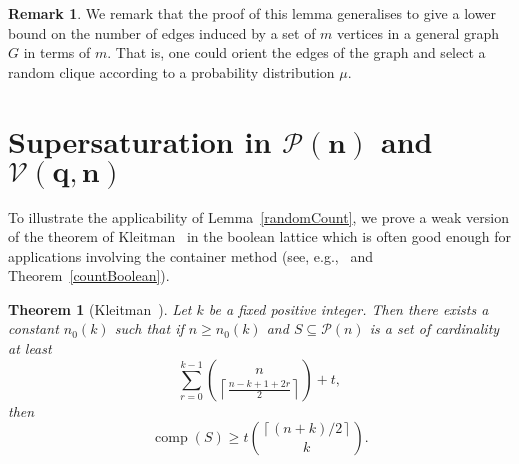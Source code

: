 \documentclass[11 pt]{article}
\newtheorem{thm}[equation]{Theorem}
\theoremstyle{definition}
\newtheorem{rem}[equation]{Remark}
\theoremstyle{case}
\numberwithin{equation}{section}
\DeclareMathOperator{\comp}{comp}
\newcommand{\Vectors}[2]{\mathcal{V}\left(#1,#2\right)}
\begin{document}
\begin{rem}
We remark that the proof of this lemma  generalises to give a lower bound on the number of edges induced by a set of $m$ vertices in a general graph $G$ in terms of $m$. That is, one could orient the edges of the graph and select a random clique according to a probability distribution $\mu$.
\end{rem}

\section{Supersaturation in \texorpdfstring{$\boldsymbol{\mathcal{P}(n)}$}{P(n)} and \texorpdfstring{$\boldsymbol{\Vectors{q}{n}}$}{V(q,n)}}
\label{exampleSec}

To illustrate the applicability of Lemma~\ref{randomCount}, we prove a weak version of the theorem of  Kleitman~\cite{superKleitman} in the boolean lattice which is often good enough for applications involving the container method (see, e.g.,~\cite{RandomSperner,RandomErdos,BaloghWagnerBoolean} and Theorem~\ref{countBoolean}).

\begin{thm}[Kleitman~\cite{superKleitman}]
\label{booleanThm}
Let $k$ be a fixed positive integer. Then there exists a constant $n_0(k)$ such that if $n\geq n_0(k)$ and $S\subseteq \mathcal{P}(n)$ is a set of cardinality at least 
\[\sum_{r=0}^{k-1}\binom{n}{\left\lceil \frac{n-k+1 +2r}{2}\right\rceil} + t,\]
then
\[\comp(S)\geq t\binom{\left\lceil (n+k)/2\right\rceil}{k}.\]
\end{thm}
\end{document}
